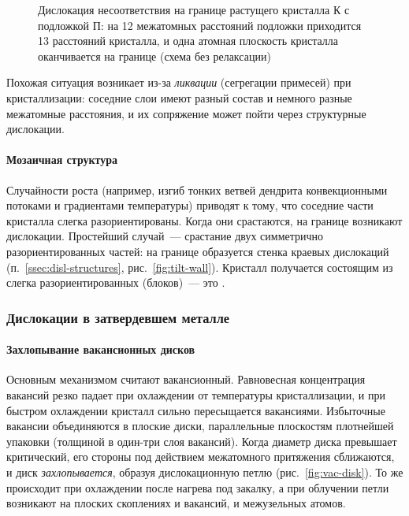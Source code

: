 \begin{figure}[ht]
\centering
{}
\caption{Дислокация несоответствия на границе растущего кристалла К с
подложкой П: на 12 межатомных расстояний подложки приходится 13
расстояний кристалла, и одна атомная плоскость кристалла оканчивается на
границе (схема без релаксации)}
\label{fig:misfit}
\end{figure}

Похожая ситуация возникает из-за \emph{ликвации} (сегрегации примесей) при
кристаллизации: соседние слои имеют разный состав и немного разные
межатомные расстояния, и их сопряжение может пойти через структурные
дислокации.

\paragraph{Мозаичная структура}
Случайности роста (например, изгиб тонких ветвей дендрита конвекционными
потоками и градиентами температуры) приводят к тому, что соседние части
кристалла слегка разориентированы. Когда они срастаются, на границе
возникают дислокации. Простейший случай~— срастание двух симметрично
разориентированных частей: на границе образуется стенка краевых
дислокаций (п.~\ref{ssec:disl-structures}, рис.~\ref{fig:tilt-wall}).
Кристалл получается состоящим из слегка разориентированных
 (блоков)~— это .

\subsubsection{Дислокации в затвердевшем металле}

\paragraph{Захлопывание вакансионных дисков}
Основным механизмом считают вакансионный. Равновесная концентрация
вакансий резко падает при охлаждении от температуры кристаллизации, и при
быстром охлаждении кристалл сильно пересыщается вакансиями. Избыточные
вакансии объединяются в плоские диски, параллельные плоскостям плотнейшей
упаковки (толщиной в один-три слоя вакансий). Когда диаметр диска
превышает критический, его стороны под действием межатомного притяжения
сближаются, и диск \emph{захлопывается}, образуя дислокационную петлю
(рис.~\ref{fig:vac-disk}). То же происходит при охлаждении после нагрева
под закалку, а при облучении петли возникают на плоских скоплениях и
вакансий, и межузельных атомов.

